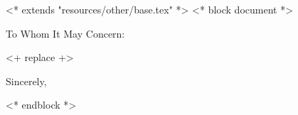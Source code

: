 <* extends "resources/other/base.tex" *>
<* block document *>
\signature{<+ user.name +>}
\address{<+ user.full_address | replace("\n","\\\\") +>}


\begin{letter}{\recipientaddress}
\opening{To Whom It May Concern:}

<+ replace +>
\closing{Sincerely,}

\end{letter}

<* endblock *>
